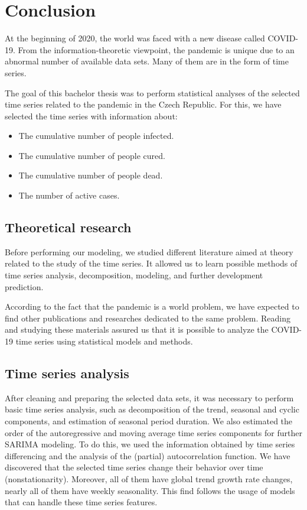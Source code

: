\chapter{Conclusion}
At the beginning of 2020, the world was faced with a new disease called COVID-19. From the information-theoretic viewpoint, the pandemic is unique due to an abnormal number of available data sets. Many of them are in the form of time series.

The goal of this bachelor thesis was to perform statistical analyses of the selected time series related to the pandemic in the Czech Republic. For this, we have selected the time series with information about:
\begin{itemize}
    \item The cumulative number of people infected.
    \item The cumulative number of people cured.
    \item The cumulative number of people dead.
    \item The number of active cases.
\end{itemize}

\section{Theoretical research}

Before performing our modeling, we studied different literature aimed at theory related to the study of the time series. It allowed us to learn possible methods of time series analysis, decomposition, modeling, and further development prediction. 

According to the fact that the pandemic is a world problem, we have expected to find other publications and researches dedicated to the same problem. Reading and studying these materials assured us that it is possible to analyze the COVID-19 time series using statistical models and methods.

\section{Time series analysis}

After cleaning and preparing the selected data sets, it was necessary to perform basic time series analysis, such as decomposition of the trend, seasonal and cyclic components, and estimation of seasonal period duration. We also estimated the order of the autoregressive and moving average time series components for further SARIMA modeling. To do this, we used the information obtained by time series differencing and the analysis of the (partial) autocorrelation function. We have discovered that the selected time series change their behavior over time (nonstationarity). Moreover, all of them have global trend growth rate changes, nearly all of them have weekly seasonality. This find follows the usage of models that can handle these time series features.

